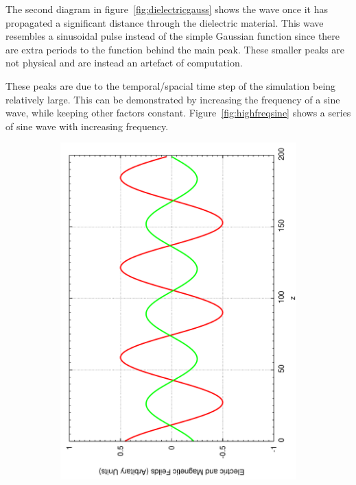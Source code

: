The second diagram in figure~\ref{fig:dielectricgauss} shows the wave once it has propagated a significant distance through the dielectric material. This wave resembles a sinusoidal pulse instead of the simple Gaussian function since there are extra periods to the function behind the main peak. These smaller peaks are not physical and are instead an artefact of computation.

These peaks are due to the temporal/spacial time step of the simulation being relatively large. This can be demonstrated by increasing the frequency of a sine wave, while keeping other factors constant. Figure~\ref{fig:highfreqsine} shows a series of sine wave with increasing frequency.
\begin{figure}[ht]
        \centering
        \begin{subfigure}[ht]{0.45\textwidth}
                \centering
                \includegraphics[angle=270, width=\textwidth]{highfreqsine1.pdf}

\end{subfigure}
\end{figure}

